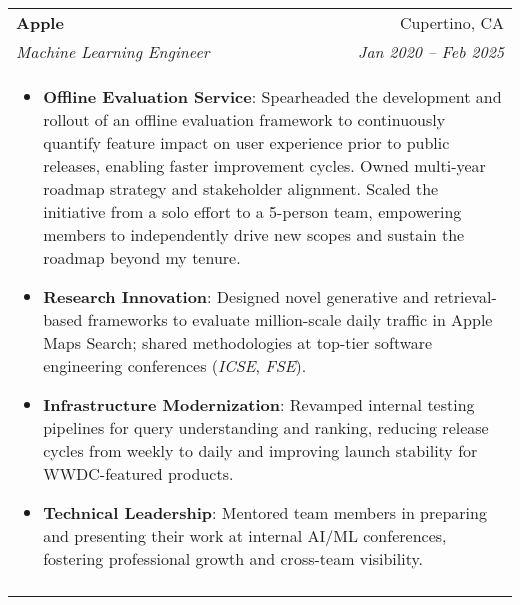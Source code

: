 \documentclass[letterpaper,11pt]{article}
\begin{document}
\begin{tabular*}{0.97\textwidth}[t]{l@{\extracolsep{\fill}}r}
  \textbf{Apple} & Cupertino, CA \\
  \textit{\small Machine Learning Engineer} & \textit{\small Jan 2020 -- Feb 2025} \\
  \multicolumn{2}{l}{
    \begin{minipage}{\textwidth}
      \vspace{0.3em}
      \begin{itemize}[leftmargin=*, itemsep=-4.5pt, topsep=0pt, label={\raisebox{0.4ex}{\tiny\textbullet}}]       
        \item {\bf Offline Evaluation Service}: Spearheaded the development and rollout of an offline evaluation framework to continuously quantify feature impact on user experience prior to public releases, enabling faster improvement cycles. Owned multi-year roadmap strategy and stakeholder alignment. Scaled the initiative from a solo effort to a 5-person team, empowering members to independently drive new scopes and sustain the roadmap beyond my tenure.
        \item {\bf Research Innovation}: Designed novel generative and retrieval-based frameworks to evaluate million-scale daily traffic in Apple Maps Search; shared methodologies at top-tier software engineering conferences ({\it ICSE}, {\it FSE}).
        \item {\bf Infrastructure Modernization}: Revamped internal testing pipelines for query understanding and ranking, reducing release cycles from weekly to daily and improving launch stability for WWDC-featured products.
        \item {\bf Technical Leadership}: Mentored team members in preparing and presenting their work at internal AI/ML conferences, fostering professional growth and cross-team visibility.
      \end{itemize}
    \end{minipage}
  } \\
  \noalign{\vspace{0.7em}}


\end{tabular*}
\end{document}
